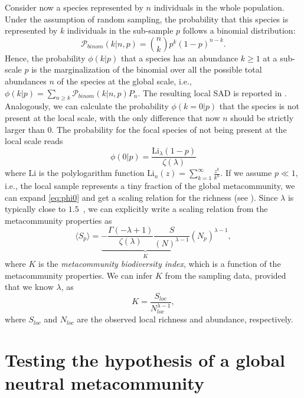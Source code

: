 \documentclass[%
 preprint,            %
 superscriptaddress, %
 amsmath,amssymb,    %
 aps,                %
 pra,                %
 floatfix,           %
]{revtex4-2}
\begin{document}
Consider now a species represented by $n$ individuals in the whole population. Under the assumption of random sampling, the probability that this species is represented by $k$ individuals in the sub-sample $p$ follows a binomial distribution:
\begin{equation}
\mathcal{P}_{binom}\left(k|n,p\right) = \binom{n}{k}p^k \left(1-p\right)^{n-k}.
\label{eq:binomialmat}
\end{equation}
Hence, the probability $\phi(k|p)$ that a species has an abundance $k\geq1$ at a sub-scale $p$ is the marginalization of the binomial over all the possible total abundances $n$ of the species at the global scale, i.e., $\phi(k|p) = \sum_{n\geq k} \mathcal{P}_{binom}\left(k|n,p\right) P_n$. The resulting local SAD is reported in \cite{pigani2024deviation}. Analogously, we can calculate the probability $\phi(k=0|p)$ that the species is not present at the local scale, with the only difference that now $n$ should be strictly larger than $0$. The probability for the focal species of not being present at the local scale reads
\begin{equation}
    \phi(0|p) =\frac{\text{Li}_{\lambda}(1-p)}{\zeta (\lambda)}
    \label{eq:phi0}
\end{equation}
where $\text{Li}$ is the polylogarithm function $\text{Li}_n(z)=\sum _{k=1}^{\infty } \frac{z^k}{k^n}$. If we assume $p\ll1$, i.e., the local sample represents a tiny fraction of the global metacommunity, we can expand \eqref{eq:phi0} and get a scaling relation for the richness (see \cite{pigani2024deviation}). Since $\lambda$ is typically close to $1.5$~\cite{sergiacomi2018ubiquitous}, we can explicitly write a scaling relation from the metacommunity properties as
\begin{equation}
    \langle S_p \rangle =      \underbrace{-\frac{\Gamma (-\lambda+1 )}{\zeta (\lambda)} \frac{S}{(N)^{\lambda-1}}}_{K} (N_p)^{\lambda-1},
    \label{eq:HeapsTaraMM}
\end{equation}
where $K$ is the \emph{metacommunity biodiversity index}, which is a function of the metacommunity properties. We can infer $K$ from the sampling data, provided that we know $\lambda$, as
\begin{equation}
    K = \frac{S_{loc}}{N_{loc}^{\lambda-1}},
    \label{eq:K-metacom}
\end{equation}
where $S_{loc}$ and $N_{loc}$ are the observed local richness and abundance, respectively. 

\section{Testing the hypothesis of a global neutral metacommunity}
\end{document}
